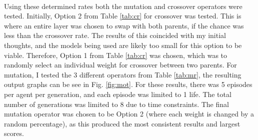 \paragraph{}


Using these determined rates both the mutation and crossover operators were tested. Initially, Option 2 from Table \ref{tab:cr} for crossover was tested. This is where an entire layer was chosen to swap with both parents, if the chance was less than the crossover rate. The results of this coincided with my initial thoughts, and the models being used are likely too small for this option to be viable. Therefore, Option 1 from Table \ref{tab:cr} was chosen, which was to randomly select an individual weight for crossover between two parents. For mutation, I tested the 3 different operators from Table \ref{tab:mr}, the resulting output graphs can be see in Fig. \ref{fig:mot}. For these results, there was 5 episodes per agent per generation, and each episode was limited to 1 life. The total number of generations was limited to 8 due to time constraints. The final mutation operator was chosen to be Option 2 (where each weight is changed by a random percentage), as this produced the most consistent results and largest scores.

